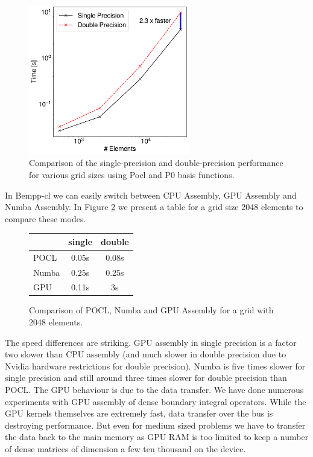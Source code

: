 \begin{figure}
	\center
	\includegraphics[width=7cm]{img/pocl_single_layer.pdf}
	\caption{Comparison of the single-precision and double-precision performance for various grid sizes using Pocl and P0 basis functions.}
	\label{fig:pocl_single_layer}
\end{figure}

In Bempp-cl we can easily switch between CPU Assembly, GPU Assembly and Numba Assembly. In Figure \ref{fig:cpu_gpu_numba_compare} we present a table for a grid size 2048 elements to compare these modes.
\begin{figure}
\begin{center}
\begin{tabular}{l|c|c}
	        &   single      &    double\\
	        \hline
	 POCL   &   0.05s       &    0.08s\\
	 Numba  &   0.25s       &    0.25s\\
	 GPU    &   0.11s       &    3s\\
\end{tabular}
\end{center}
\caption{Comparison of POCL, Numba and GPU Assembly for a grid with 2048 elements.}
\label{fig:cpu_gpu_numba_compare}
\end{figure}
The speed differences are striking. GPU assembly in single precision is a factor two slower than CPU assembly (and much slower in double precision due to Nvidia hardware restrictions for double precision). Numba is five times slower for single precision and still around three times slower for double precision than POCL. The GPU behaviour is due to the data transfer. We have done numerous experiments with GPU assembly of dense boundary integral operators. While the GPU kernels themselves are extremely fast, data transfer over the bus is destroying performance. But even for medium sized problems we have to transfer the data back to the main memory as GPU RAM is too limited to keep a number of dense matrices of dimension a few ten thousand on the device.

